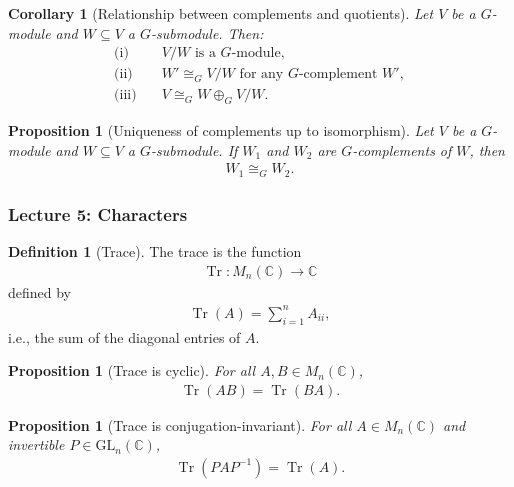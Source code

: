 \documentclass[titlepage]{article}
\theoremstyle{plain}
\newtheorem{proposition}[theorem]{Proposition}
\newtheorem{corollary}[theorem]{Corollary}
\theoremstyle{definition}
\newtheorem{definition}{Definition}[section]
\theoremstyle{remark}
\theoremstyle{exercise-style}
\numberwithin{equation}{section}
\numberwithin{theorem}{section}
\numberwithin{remark}{section}
\begin{document}
\begin{corollary}[Relationship between complements and quotients]
Let $V$ be a $G$-module and $W \subseteq V$ a $G$-submodule. Then:
\begin{align}
\text{(i)} \quad & V/W \text{ is a $G$-module}, \\
\text{(ii)} \quad & W' \cong_G V/W \text{ for any $G$-complement } W', \\
\text{(iii)} \quad & V \cong_G W \oplus_G V/W.
\end{align}
\end{corollary}

\begin{proposition}[Uniqueness of complements up to isomorphism]
Let $V$ be a $G$-module and $W \subseteq V$ a $G$-submodule. If $W_1$ and $W_2$ are $G$-complements of $W$, then
\begin{align}
W_1 \cong_G W_2.
\end{align}
\end{proposition}

\subsubsection{Lecture 5: Characters}


\begin{definition}[Trace]
The trace is the function
\begin{align}
\operatorname{Tr}: M_n(\mathbb{C}) \to \mathbb{C}
\end{align}
defined by
\begin{align}
\operatorname{Tr}(A) = \sum_{i=1}^n A_{ii},
\end{align}
i.e., the sum of the diagonal entries of $A$.
\end{definition}

\begin{proposition}[Trace is cyclic]
For all $A,B \in M_n(\mathbb{C})$,
\begin{align}
\operatorname{Tr}(AB) = \operatorname{Tr}(BA).
\end{align}
\end{proposition}

\begin{proposition}[Trace is conjugation-invariant]
For all $A \in M_n(\mathbb{C})$ and invertible $P \in \mathrm{GL}_n(\mathbb{C})$,
\begin{align}
\operatorname{Tr}(PAP^{-1}) = \operatorname{Tr}(A).
\end{align}
\end{proposition}
\end{document}
